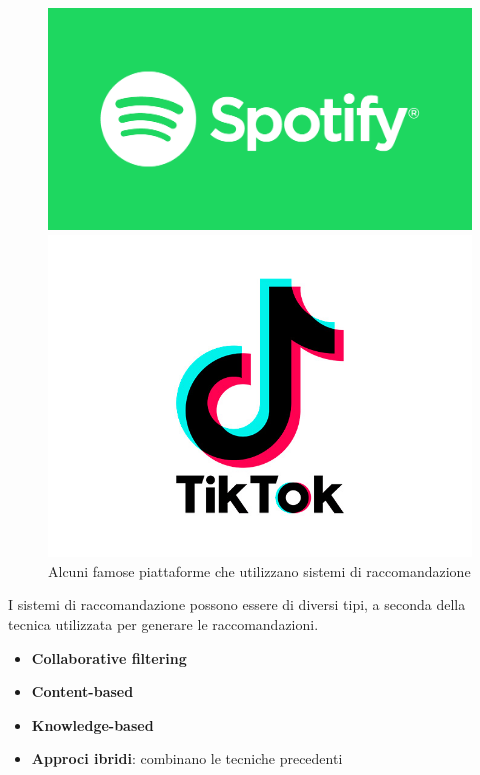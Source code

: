 \begin{figure}[h!]
\begin{minipage}{0.2\textwidth}
        \centering
        \includegraphics[width=\textwidth]{images/spotify.png}
    \end{minipage}\hfill
    \begin{minipage}{0.2\textwidth}
        \centering
        \includegraphics[width=\textwidth]{images/tiktok.png}
    \end{minipage}
    \caption{Alcuni famose piattaforme che utilizzano sistemi di raccomandazione}
\end{figure}


\noindent I sistemi di raccomandazione possono essere di diversi tipi, a seconda della tecnica utilizzata per generare le raccomandazioni.
\begin{itemize}
    \item \textbf{Collaborative filtering} \cite{CFRS}
    \item \textbf{Content-based} \cite{ContentBasedRS}
    \item \textbf{Knowledge-based} \cite{KnowledgeBased}
    \item \textbf{Approci ibridi}: combinano le tecniche precedenti
\end{itemize}



